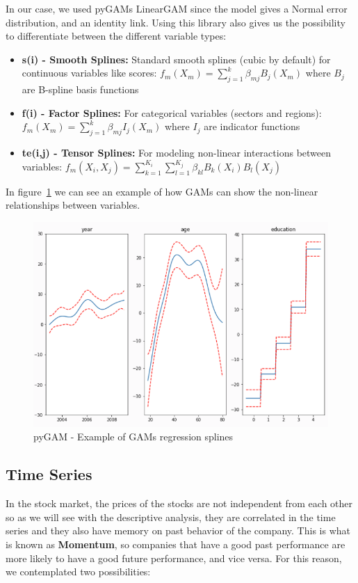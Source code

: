 \documentclass[11pt,english,a4paper,hidelinks]{book}
\begin{document}
\noindent In our case, we used pyGAMs LinearGAM since the model gives a Normal error distribution, and an identity link. Using this library also gives us the possibility to differentiate between the different variable types:

\begin{itemize}
    \item \textbf{s(i) - Smooth Splines:} Standard smooth splines (cubic by default) for continuous variables like scores: \(f_m(X_m) = \sum_{j=1}^{k} \beta_{mj} B_j(X_m)\) where \(B_j\) are B-spline basis functions
    \item \textbf{f(i) - Factor Splines:} For categorical variables (sectors and regions): \(f_m(X_m) = \sum_{j=1}^{k} \beta_{mj} I_j(X_m)\) where \(I_j\) are indicator functions
    \item \textbf{te(i,j) - Tensor Splines:} For modeling non-linear interactions between variables: \(f_m(X_i, X_j) = \sum_{k=1}^{K_i} \sum_{l=1}^{K_j} \beta_{kl} B_k(X_i) B_l(X_j)\)
\end{itemize}

\noindent In figure~\ref{fig:splines_example} we can see an example of how GAMs can show the non-linear relationships between variables.
\begin{figure}[H]
    \centering
    \includegraphics[width=1\textwidth]{images/code/descriptive analysis/gam/splines_example.png}
    \caption{pyGAM - Example of GAMs regression splines}
    \label{fig:splines_example}
\end{figure}

\subsection{Time Series}
In the stock market, the prices of the stocks are not independent from each other so as we will see with the descriptive analysis, they are correlated in the time series and they also have memory on past behavior of the company. This is what is known as \textbf{Momentum}, so companies that have a good past performance are more likely to have a good future performance, and vice versa. For this reason, we contemplated two possibilities:
\end{document}
